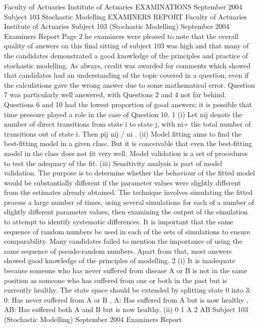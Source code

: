 Faculty of Actuaries Institute of Actuaries
EXAMINATIONS
September 2004
Subject 103 Stochastic Modelling
EXAMINERS REPORT
Faculty of Actuaries
Institute of Actuaries
Subject 103 (Stochastic Modelling) September 2004 Examiners Report
Page 2
he examiners were pleased to note that the overall quality of answers on this
final sitting of subject 103 was high and that many of the candidates
demonstrated a good knowledge of the principles and practice of stochastic
modelling. As always, credit was awarded for comments which showed that
candidates had an understanding of the topic covered in a question, even if the
calculations gave the wrong answer due to some mathematical error.
Question 7 was particularly well answered, with Questions 2 and 4 not far
behind. Questions 6 and 10 had the lowest proportion of good answers; it is
possible that time pressure played a role in the case of Question 10.
1 (i) Let nij denote the number of direct transitions from state i to state j, with ni+
the total number of transitions out of state i. Then pij nij / ni .
(ii) Model fitting aims to find the best-fitting model in a given class. But it is
conceivable that even the best-fitting model in the class does not fit very well.
Model validation is a set of procedures to test the adequacy of the fit.
(iii) Sensitivity analysis is part of model validation. The purpose is to determine
whether the behaviour of the fitted model would be substantially different if
the parameter values were slightly different from the estimates already
obtained.
The technique involves simulating the fitted process a large number of times,
using several simulations for each of a number of slightly different parameter
values, then examining the output of the simulation to attempt to identify
systematic differences.
It is important that the same sequence of random numbers be used in each of
the sets of simulations to ensure comparability.
Many candidates failed to mention the importance of using the same sequence
of pseudo-random numbers. Apart from that, most answers showed good
knowledge of the principles of modelling.
2 (i) It is inadequate because someone who has never suffered from disease A or B
is not in the same position as someone who has suffered from one or both in
the past but is currently healthy.
The state space should be extended by splitting state 0 into 3: 0: Has never
suffered from A or B , A: Has suffered from A but is now healthy ,
AB: Has suffered both A and B but is now healthy.
(ii)
0
1
A
2
AB
Subject 103 (Stochastic Modelling) September 2004 Examiners Report
